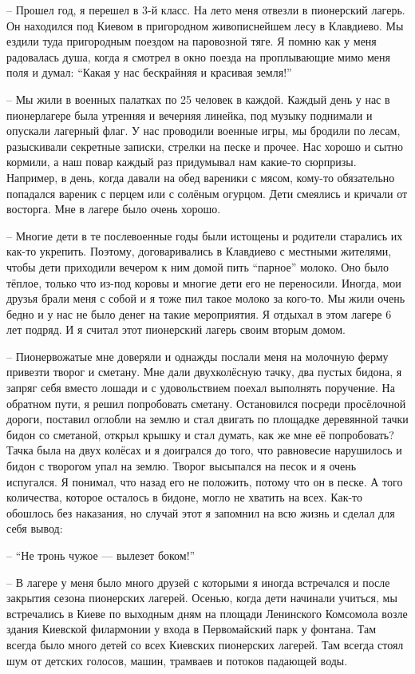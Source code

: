 – Прошел год, я перешел в 3-й класс. На лето меня отвезли в пионерский лагерь.
Он находился под Киевом в пригородном живописнейшем лесу в Клавдиево. Мы ездили
туда пригородным поездом на паровозной тяге. Я помню как у меня радовалась
душа, когда я смотрел в окно поезда на проплывающие мимо меня поля и думал:
“Какая у нас бескрайняя и красивая земля!”

– Мы жили в военных палатках по 25 человек в каждой. Каждый день у нас в
пионерлагере была утренняя и вечерняя линейка, под музыку поднимали и опускали
лагерный флаг. У нас проводили военные игры, мы бродили по лесам, разыскивали
секретные записки, стрелки на песке и прочее. Нас хорошо и сытно кормили, а наш
повар каждый раз придумывал нам какие-то сюрпризы. Например, в день, когда
давали на обед вареники с мясом, кому-то обязательно попадался вареник с перцем
или с солёным огурцом. Дети смеялись и кричали от восторга. Мне в лагере было
очень хорошо.

– Многие дети в те послевоенные годы были истощены и родители старались их
как-то укрепить. Поэтому, договаривались в Клавдиево с местными жителями, чтобы
дети приходили вечером к ним домой пить “парное” молоко. Оно было тёплое,
только что из-под коровы и многие дети его не переносили. Иногда, мои друзья
брали меня с собой и я тоже пил такое молоко за кого-то. Мы жили очень бедно и
у нас не было денег на такие мероприятия. Я отдыхал в этом лагере 6 лет подряд.
И я считал этот пионерский лагерь своим вторым домом.

– Пионервожатые мне доверяли и однажды послали меня на молочную ферму привезти
творог и сметану. Мне дали двухколёсную тачку, два пустых бидона, я запряг себя
вместо лошади и с удовольствием поехал выполнять поручение. На обратном пути, я
решил попробовать сметану. Остановился посреди просёлочной дороги, поставил
оглобли на землю и стал двигать по площадке деревянной тачки бидон со сметаной,
открыл крышку и стал думать, как же мне её попробовать? Тачка была на двух
колёсах и я доигрался  до того, что равновесие нарушилось и бидон с творогом
упал на землю. Творог высыпался на песок и я очень испугался. Я понимал, что
назад его не положить, потому что он в песке. А того количества, которое
осталось в бидоне, могло не хватить на всех. Как-то обошлось без наказания, но
случай этот я запомнил на всю жизнь и сделал для себя вывод:

– “Не тронь чужое — вылезет боком!” 

– В лагере у меня было много друзей с которыми я иногда встречался и после
закрытия сезона пионерских лагерей. Осенью, когда дети начинали учиться, мы
встречались в Киеве по выходным дням на площади Ленинского Комсомола возле
здания Киевской филармонии у входа в Первомайский парк у фонтана. Там всегда
было много детей со всех Киевских пионерских лагерей. Там всегда стоял шум от
детских голосов, машин, трамваев и потоков падающей воды.

